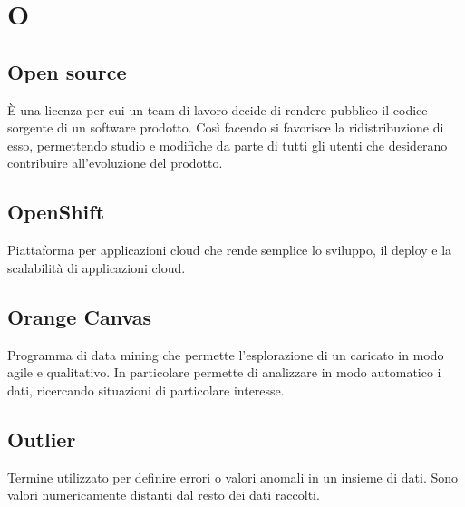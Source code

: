 \section*{O}
\markright{}

\subsection*{Open source}
È una licenza per cui un team di lavoro decide di rendere pubblico il codice sorgente di un software prodotto. Così facendo si favorisce la ridistribuzione di esso, permettendo studio e modifiche da parte di tutti gli utenti che desiderano contribuire all'evoluzione del prodotto.

\subsection*{OpenShift}
Piattaforma per applicazioni cloud che rende semplice lo sviluppo, il deploy e la scalabilità di applicazioni cloud.

\subsection*{Orange Canvas}
Programma di data mining  che permette l'esplorazione di un  caricato in modo agile e qualitativo. In particolare permette di analizzare in modo automatico i dati, ricercando situazioni di particolare interesse.

\subsection*{Outlier}
Termine utilizzato per definire errori o valori anomali in un insieme di dati. Sono valori numericamente distanti dal resto dei dati raccolti.